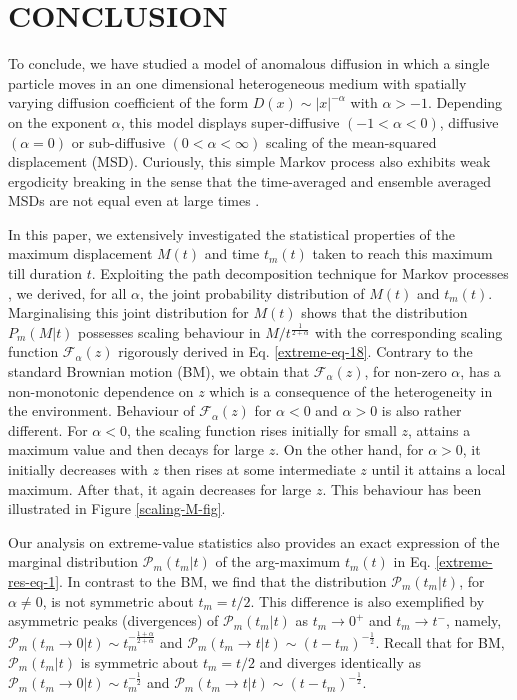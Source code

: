 \documentclass[showpacs,amsmath,amssymb,aps,pre,twocolumn,]{revtex4-1}
\def\greenw#1{{\color{black} #1}}
\def\bluew#1{{\color{black} #1}}
\begin{document}
\section{CONCLUSION}
\label{conclusion}
To conclude, we have studied a model of anomalous diffusion in which a single particle moves in an one dimensional heterogeneous medium with spatially varying diffusion coefficient of the form $D(x) \sim |x|^{-\alpha}$ with $\alpha >-1$. Depending on the exponent $\alpha$, this model displays super-diffusive $(-1<\alpha <0)$, diffusive $(\alpha =0)$ or sub-diffusive $(0<\alpha <\infty)$ scaling of the mean-squared displacement (MSD). Curiously, this simple Markov process also exhibits weak ergodicity breaking in the sense that the time-averaged and ensemble averaged MSDs are not equal even at large times \cite{Cherstvy2013, Cherstvy2014, Leibovich2019,Cherstvy2015, Wang2019, Fa2005, new2}.

In this paper, we extensively investigated the statistical properties of the maximum displacement $M(t)$ and time $t_m(t)$ taken to reach this maximum till duration $t$. Exploiting the path decomposition technique for Markov processes \bluew{\cite{tmax-2}}, we derived, for all $\alpha$, the joint probability distribution of $M(t)$ and $t_m(t)$. Marginalising this joint distribution for $M(t)$ shows that the distribution $P_m(M|t)$ possesses scaling behaviour in $M/t^{\frac{1}{2+\alpha}}$ with the corresponding scaling function $\mathcal{F}_{\alpha}(z)$ rigorously derived in Eq. \eqref{extreme-eq-18}. \greenw{Contrary to the standard Brownian motion (BM), we obtain that $\mathcal{F}_{\alpha}(z)$, for non-zero $\alpha$, has a non-monotonic dependence on $z$ which is a consequence of the heterogeneity in the environment. Behaviour of $\mathcal{F}_{\alpha}(z)$ for $\alpha <0$ and $\alpha >0$ is also rather different. For $\alpha <0$, the scaling function rises initially for small $z$, attains a maximum value and then decays for large $z$. On the other hand, for $\alpha >0$, it initially decreases with $z$ then rises at some intermediate $z$ until it attains a local maximum. After that, it again decreases for large $z$. This behaviour has been illustrated in Figure \ref{scaling-M-fig}.} 

Our analysis on extreme-value statistics also provides an exact expression of the marginal distribution $\mathcal{P}_m(t_m|t)$ of the arg-maximum $t_m(t)$ in Eq. \eqref{extreme-res-eq-1}. \greenw{In contrast to the BM, we find that the distribution $\mathcal{P}_m(t_m|t)$, for $\alpha \neq 0$, is not symmetric about $t_m = t/2$. This difference is also exemplified by asymmetric peaks (divergences) of $\mathcal{P}_m(t_m|t)$ as $t_m \to 0^+$ and $t_m \to t^-$, namely, $\mathcal{P}_m \left( t_m \to 0|t \right) \sim t_m^{-\frac{1+\alpha}{2+\alpha}}$ and  $\mathcal{P}_m \left( t_m \to t|t \right) \sim (t-t_m)^{-\frac{1}{2}}$. Recall that for BM, $\mathcal{P}_m(t_m|t)$ is symmetric about $t_m = t/2$ and diverges identically as $\mathcal{P}_m \left( t_m \to 0|t \right) \sim t_m^{-\frac{1}{2}}$ and  $\mathcal{P}_m \left( t_m \to t|t \right) \sim (t-t_m)^{-\frac{1}{2}}$.}
\end{document}
